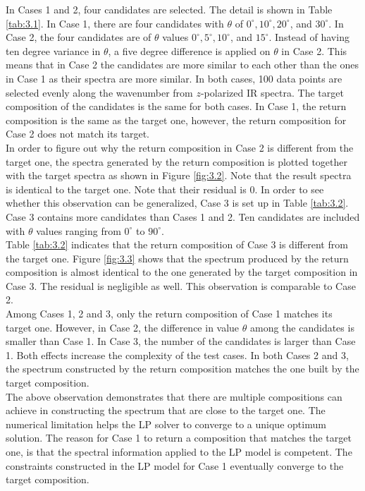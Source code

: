 In Cases 1 and 2, four candidates are selected. The detail is shown in Table \ref{tab:3.1}. In Case 1, there are four candidates with $\theta$ of $0^{\circ}, 10^{\circ}, 20^{\circ}$, and $30^{\circ}$. In Case 2, the four candidates are of $\theta$ values $0^{\circ}, 5^{\circ}, 10^{\circ}$, and $15^{\circ}$. Instead of having ten degree variance in $\theta$, a five degree difference is applied on $\theta$ in Case 2. This means that in Case 2 the candidates are more similar to each other than the ones in Case 1 as their spectra are more similar. In both cases, 100 data points are selected evenly along the wavenumber from $z$-polarized IR spectra. The target composition of the candidates is the same for both cases. In Case 1, the return composition is the same as the target one, however, the return composition for Case 2 does not match its target. \\

In order to figure out why the return composition in Case 2 is different from the target one, the spectra generated by the return composition is plotted together with the target spectra as shown in Figure \ref{fig:3.2}. Note that the result spectra is identical to the target one. Note that their residual is $0$. In order to see whether this observation can be generalized, Case 3 is set up in Table \ref{tab:3.2}. Case 3 contains more candidates than Cases 1 and 2. Ten candidates are included with $\theta$ values ranging from $0^{\circ}$ to $90^{\circ}$.  \\

Table \ref{tab:3.2} indicates that the return composition of Case 3 is different from the target one. Figure \ref{fig:3.3} shows that the spectrum produced by the return composition is almost identical to the one generated by the target composition in Case 3. The residual is negligible as well. This observation is comparable to Case 2. \\

Among Cases 1, 2 and 3, only the return composition of Case 1 matches its target one. However, in Case 2, the difference in value $\theta$ among the candidates is smaller than Case 1. In Case 3, the number of the candidates is larger than Case 1. Both effects increase the complexity of the test cases. In both Cases 2 and 3, the spectrum constructed by the return composition matches the one built by the target composition. \\

The above observation demonstrates that there are multiple compositions can achieve in constructing the spectrum that are close to the target one. The numerical limitation helps the LP solver to converge to a unique optimum solution. The reason for Case 1 to return a composition that matches the target one, is that the spectral information applied to the LP model is competent. The constraints constructed in the LP model for Case 1 eventually converge to the target composition. \\ 


